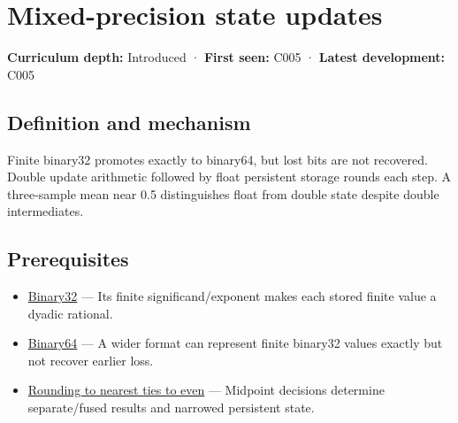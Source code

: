 \hypertarget{appendix-260182e617b7}{}\label{referencestart:appendix-260182e617b7}
\section{Mixed-precision state updates}\label{appendix-260182e617b7-mixed-precision-state-updates}

\hypertarget{appendix-260182e617b7-mixed-precision-state-updates}{}

\textbf{Curriculum depth:} Introduced · \textbf{First seen:} C005 · \textbf{Latest development:} C005

\begin{allmightroledefinition}

\subsection{Definition and mechanism}\label{appendix-260182e617b7-definition-and-mechanism}

\hypertarget{appendix-260182e617b7-definition-and-mechanism}{}

Finite binary32 promotes exactly to binary64, but lost bits are not recovered. Double update arithmetic followed by float persistent storage rounds each step. A three-sample mean near 0.5 distinguishes float from double state despite double intermediates.

\end{allmightroledefinition}

\subsection{Prerequisites}\label{appendix-260182e617b7-prerequisites}

\hypertarget{appendix-260182e617b7-prerequisites}{}

\begin{itemize}
\tightlist
\item
  \hyperref[appendix-5057f9ad327f]{Binary32} --- Its finite significand/exponent makes each stored finite value a dyadic rational.
\item
  \hyperref[appendix-5078dfab64e6]{Binary64} --- A wider format can represent finite binary32 values exactly but not recover earlier loss.
\item
  \hyperref[appendix-614afe1de592]{Rounding to nearest ties to even} --- Midpoint decisions determine separate/fused results and narrowed persistent state.
\end{itemize}

